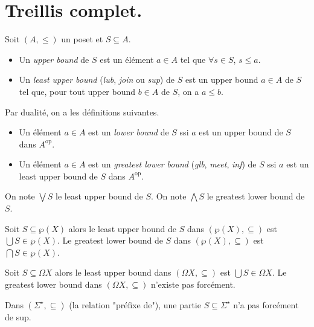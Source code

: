 \documentclass[./main]{subfiles}
\begin{document}
  \section{Treillis complet.}

  \begin{defn}
    Soit $(A, {\le})$ un poset et $S \subseteq A$.
    \begin{itemize}
      \item Un \textit{upper bound} de $S$ est un élément $a \in A$ tel que $\forall s \in S$, $s \le a$.
      \item Un \textit{least upper bound} (\textit{lub}, \textit{join} ou \textit{sup}) de $S$ est un upper bound $a \in A$ de $S$ tel que, pour tout upper bound $b \in A$ de $S$, on a $a \le b$.
    \end{itemize}

    Par dualité, on a les définitions suivantes.
    \begin{itemize}
      \item Un élément $a \in A$ est un \textit{lower bound} de $S$ ssi $a$ est un upper bound de $S$ dans $A^\mathrm{op}$.
      \item Un élément $a \in A$ est un \textit{greatest lower bound} (\textit{glb}, \textit{meet}, \textit{inf}) de $S$ ssi $a$ est un least upper bound de $S$ dans $A^\mathrm{op}$.
    \end{itemize}

    On note $\bigvee S$ le least upper bound de $S$.
    On note $\bigwedge S$ le greatest lower bound de $S$.
  \end{defn}

  \begin{exm}
    Soit $S \subseteq \wp(X)$ alors le least upper bound de $S$ dans $(\wp(X), \subseteq)$ est $\bigcup S \in \wp(X)$.
    Le greatest lower bound de $S$ dans $(\wp(X), \subseteq)$ est $\bigcap S \in \wp(X)$.
  \end{exm}

  \begin{exm}
    Soit $S \subseteq \Omega X$ alors le least upper bound dans ${(\Omega X, \subseteq)}$ est $\bigcup S \in \Omega X$.
    Le greatest lower bound dans $(\Omega X, \subseteq)$ n'existe pas forcément.
  \end{exm}

  \begin{exm}
    Dans $(\Sigma^\star, \subseteq)$ (la relation "préfixe de"), une partie $S \subseteq \Sigma^\star$ n'a pas forcément de sup.
  \end{exm}
\end{document}
